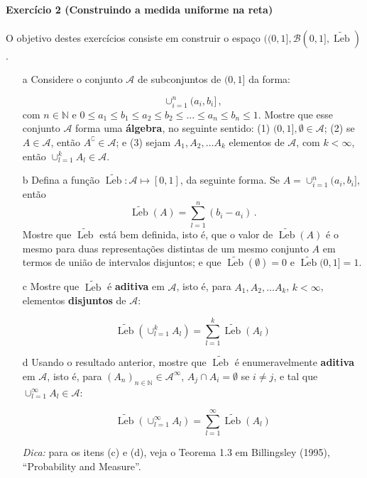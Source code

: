\documentclass[10pt,a4paper]{article}
\begin{document}
	\paragraph{Exercício 2 (Construindo a medida uniforme na reta)} O objetivo destes exercícios consiste em construir o espaço $((0,1],\mathcal{B}(0,1], \widetilde{\operatorname{Leb}})$.
	\begin{itemize}
		\item[a] Considere o conjunto $\mathcal{A}$ de subconjuntos de $(0,1]$ da forma:
		
		$$\cup_{i=1}^n (a_i,b_i]\, ,$$
		com $n \in \mathbb{N}$ e $0\leq a_1\leq b_1 \leq a_2\leq b_2 \leq \ldots \leq a_n \leq b_n \leq 1$. Mostre que esse conjunto $\mathcal{A}$ forma uma \textbf{álgebra}, no seguinte sentido: (1) $(0,1], \emptyset \in \mathcal{A}$; (2) se $A\in \mathcal{A}$, então $A^\complement \in \mathcal{A}$; e (3) sejam $A_1, A_2, \ldots A_k$ elementos de $\mathcal{A}$, com $k <\infty$, então $\cup_{l=1}^k A_l \in \mathcal{A}$.
		\item[b] Defina a função ${\widetilde{\operatorname{Leb}}}: \mathcal{A}\mapsto [0,1]$, da seguinte forma. Se $A = \cup_{i=1}^n (a_i,b_i]$, então
		$${\widetilde{\operatorname{Leb}}}(A) = \sum_{l=1}^n (b_i - a_i)\, .$$
		Mostre que $\widetilde{\operatorname{Leb}}$ está bem definida, isto é, que o valor de ${\widetilde{\operatorname{Leb}}}(A)$ é o mesmo para duas representações distintas de um mesmo conjunto $A$ em termos de união de intervalos disjuntos; e que ${\widetilde{\operatorname{Leb}}}(\emptyset) = 0$ e ${\widetilde{\operatorname{Leb}}}(0,1]=1$.
		
		\item[c] Mostre que ${\widetilde{\operatorname{Leb}}}$ é \textbf{aditiva} em $\mathcal{A}$, isto é, para $A_1, A_2, \ldots A_k$, $k <\infty$, elementos \textbf{disjuntos} de $\mathcal{A}$:
		
		$$\widetilde{\operatorname{Leb}}(\cup_{l=1}^k A_l) = \sum_{l=1}^k \widetilde{\operatorname{Leb}}(A_l)$$
		\item[d] Usando o resultado anterior, mostre que   $\widetilde{\operatorname{Leb}}$ é enumeravelmente \textbf{aditiva} em $\mathcal{A}$, isto é, para  $(A_n)_{n \in \mathbb{N}} \in \mathcal{A}^\infty$, $A_j \cap A_i = \emptyset$ se $i \neq j$, {\color{red}e tal que $\cup_{l=1}^\infty A_l \in \mathcal{A}$}:
		
		$$\widetilde{\operatorname{Leb}}(\cup_{l=1}^\infty A_l) = \sum_{l=1}^\infty \widetilde{\operatorname{Leb}}(A_l)$$
		
		\textit{Dica:} para os itens (c) e (d), veja o Teorema 1.3 em Billingsley (1995), ``Probability and Measure''.
		

\end{itemize}
\end{document}
